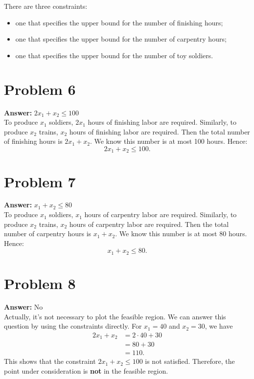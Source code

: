 \documentclass[11pt]{article}
\begin{document}
There are three constraints:
\begin{itemize}
\item one that specifies the upper bound for the number of finishing hours;
\item one that specifies the upper bound for the number of carpentry hours;
\item one that specifies the upper bound for the number of toy soldiers.
\end{itemize}
\section*{Problem 6}
\label{sec:orgf9efdbf}

\textbf{Answer:} \(2x_1+x_2\leq 100\)\\

To produce \(x_1\) soldiers, \(2x_1\) hours of finishing labor are required.
Similarly, to produce \(x_2\) trains, \(x_2\) hours of finishing labor are
required. Then the total number of finishing hours is \(2x_1+x_2\). We know
this number is at most 100 hours. Hence:
\begin{equation*}
2x_1+x_2\leq 100.
\end{equation*}
\section*{Problem 7}
\label{sec:org43213f1}

\textbf{Answer:} \(x_1+x_2\leq 80\)\\

To produce \(x_1\) soldiers, \(x_1\) hours of carpentry labor are required.
Similarly, to produce \(x_2\) trains, \(x_2\) hours of carpentry labor are
required. Then the total number of carpentry hours is \(x_1+x_2\). We know
this number is at most 80 hours. Hence:
\begin{equation*}
x_1+x_2\leq 80.
\end{equation*}
\section*{Problem 8}
\label{sec:orgf76509b}

\textbf{Answer:} No\\

Actually, it's not necessary to plot the feasible region. We can answer this
question by using the constraints directly. For \(x_1=40\) and \(x_2=30\),
we have
\begin{align*}
2x_1+x_2&=2\cdot 40+30\\
&=80+30\\
&=110.
\end{align*}
This shows that the constraint \(2x_1+x_2\leq 100\) is not satisfied.
Therefore, the point under consideration is \textbf{not} in the feasible region.
\end{document}
